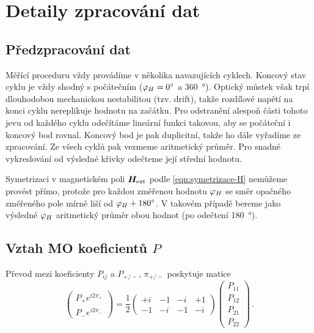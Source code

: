 \section{Detaily zpracování dat}
\label{app:zpracovani}

\subsection*{Předzpracování dat}

Měřící proceduru vždy provádíme v několika navazujících cyklech.
Koncový stav cyklu je vždy shodný s počátečním ($\varphi_H=\SI{0}{\degree}$ a \SI{360}{\degree}).
Optický můstek však trpí dlouhodobou mechanickou nestabilitou (tzv. drift), takže rozdílové napětí na konci cyklu nereplikuje hodnotu na začátku.
Pro odstranění alespoň části tohoto jevu od každého cyklu odečítáme lineární funkci takovou, aby se počáteční i koncový bod rovnal.
Koncový bod je pak duplicitní, takže ho dále vyřadíme ze zpracování.
Ze všech cyklů pak vezmeme aritmetický průměr.
Pro snadné vykreslování od výsledné křivky odečteme její střední hodnotu.

Symetrizaci v magnetickém poli $\bm{H}_\textrm{ext}$ podle \eqref{eqn:symetrizace-H} nemůžeme provést přímo, protože pro každou změřenou hodnotu $\varphi_H$ se směr opačného změřeného pole mírně liší od $\varphi_H+\SI{180}{\degree}$.
V takovém případě bereme jako výsledné $\varphi_H$ aritmetický průměr obou hodnot (po odečtení \SI{180}{\degree}).

\subsection*{Vztah MO koeficientů $P$}

Převod mezi koeficienty $P_{ij}$ a $P_{+/-}$, $\pi_{+/-}$ poskytuje matice
\begin{equation}
    \begin{pmatrix} P_+ e^{i2\pi_+} \\ P_- e^{i2\pi_-} \end{pmatrix}
    = \frac{1}{2}
    \begin{pmatrix} +i & -1 & -i & +1 \\ -1 & -i & -1 & -i \end{pmatrix}
    \begin{pmatrix} P_{11}\\P_{12}\\P_{21}\\P_{22} \end{pmatrix}  \,.
\end{equation}


